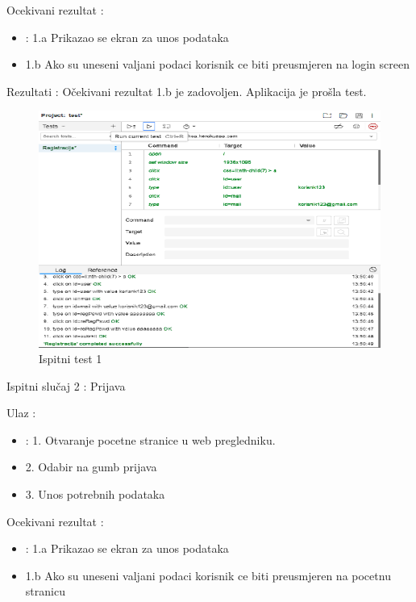 			\noindent Ocekivani rezultat : 

			\begin{itemize}
				\item : 1.a Prikazao se ekran za unos podataka
				\item   1.b Ako su uneseni valjani podaci korisnik ce biti preusmjeren na login screen
			\end{itemize}
	
			\noindent Rezultati : Očekivani rezultat 1.b je zadovoljen. Aplikacija je prošla test. 

			\begin{figure}[H]
				\includegraphics[width=1\linewidth]{slike/ispitni_test_1.png} %
				\caption{Ispitni test 1}
				\label{fig:Test1} %
			\end{figure}
			
			\noindent Ispitni slučaj 2 : Prijava

			\noindent Ulaz : 
	
			\begin{itemize}
				\item : 1. Otvaranje pocetne stranice u web pregledniku.
				\item   2. Odabir na gumb prijava
				\item   3. Unos potrebnih podataka
			\end{itemize}

			\noindent Ocekivani rezultat : 

			\begin{itemize}
				\item : 1.a Prikazao se ekran za unos podataka
				\item   1.b Ako su uneseni valjani podaci korisnik ce biti preusmjeren na pocetnu stranicu
			\end{itemize}
	
